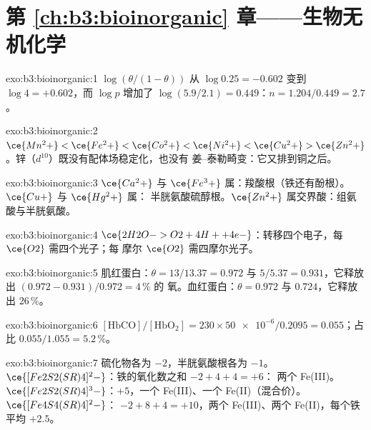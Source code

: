 \section*{第 \ref{ch:b3:bioinorganic} 章——生物无机化学}

\begin{solution}{exo:b3:bioinorganic:1}
$\log(\theta/(1 - \theta))$ 从 $\log 0.25 = -0.602$ 变到 $\log 4 = +0.602$，而 $\log p$ 增加了
$\log(5.9/2.1) = 0.449$：$n = 1.204/0.449 = 2.7$。
\end{solution}

\begin{solution}{exo:b3:bioinorganic:2}
$\ce{Mn^2+} < \ce{Fe^2+} < \ce{Co^2+} < \ce{Ni^2+} < \ce{Cu^2+} > \ce{Zn^2+}$。锌（$d^{10}$）既没有配体场稳定化，也没有
姜–泰勒畸变：它又排到铜之后。
\end{solution}

\begin{solution}{exo:b3:bioinorganic:3}
$\ce{Ca^2+}$ 与 $\ce{Fe^3+}$ 属：羧酸根（铁还有酚根）。$\ce{Cu+}$ 与 $\ce{Hg^2+}$ 属：
半胱氨酸硫醇根。$\ce{Zn^2+}$ 属交界酸：组氨酸与半胱氨酸。
\end{solution}

\begin{solution}{exo:b3:bioinorganic:4}
$\ce{2H2O -> O2 + 4H+ + 4e-}$：转移四个电子，每 $\ce{O2}$ 需四个光子；每
摩尔 $\ce{O2}$ 需四摩尔光子。
\end{solution}

\begin{solution}{exo:b3:bioinorganic:5}
肌红蛋白：$\theta = 13/13.37 = 0.972$ 与 $5/5.37 = 0.931$，它释放出 $(0.972 - 0.931)/0.972 = 4$\,\% 的
氧。血红蛋白：$\theta = 0.972$ 与 $0.724$，它释放出 26\,\%。
\end{solution}

\begin{solution}{exo:b3:bioinorganic:6}
$[\mathrm{HbCO}]/[\mathrm{HbO_2}] = 230 \times \num{50e-6}/0.2095 = 0.055$；占比 $0.055/1.055 = 5.2$\,\%。
\end{solution}

\begin{solution}{exo:b3:bioinorganic:7}
硫化物各为 $-2$，半胱氨酸根各为 $-1$。$\ce{[Fe2S2(SR)4]^2-}$：铁的氧化数之和 $-2 + 4 + 4 = +6$：
两个 Fe(III)。$\ce{[Fe2S2(SR)4]^3-}$：$+5$，一个 Fe(III)、一个 Fe(II)（混合价）。$\ce{[Fe4S4(SR)4]^2-}$：
$-2 + 8 + 4 = +10$，两个 Fe(III)、两个 Fe(II)，每个铁平均 $+2.5$。
\end{solution}

